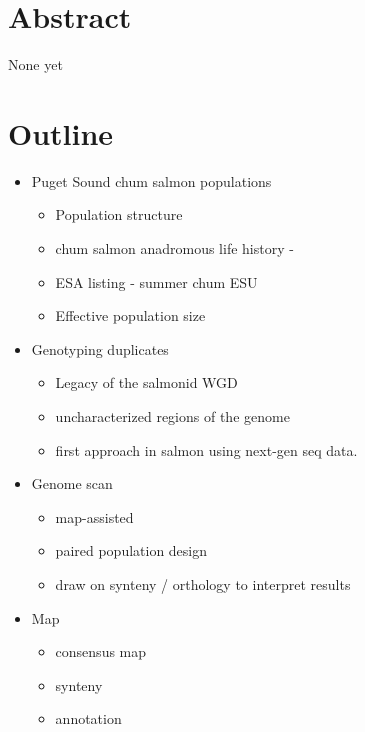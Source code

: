 \documentclass[12pt,  one column]{article}
\begin{document}
% 

\section*{Abstract}
None yet


\section*{Outline}
\begin{itemize}

\item Puget Sound chum salmon populations
\begin{itemize}
\item Population structure
\item chum salmon anadromous life history - 
\item ESA listing - summer chum ESU
\item Effective population size
\end{itemize}

\item Genotyping duplicates
\begin{itemize}
\item Legacy of the salmonid WGD
\item uncharacterized regions of the genome 
\item first approach in salmon using next-gen seq data.
\end{itemize}

\item Genome scan
\begin{itemize}
\item map-assisted
\item paired population design
\item draw on synteny / orthology to interpret results
\end{itemize}

\item Map
\begin{itemize}
\item consensus map
\item synteny
\item annotation
\end{itemize}

\end{itemize}

\pagebreak
\end{document}

